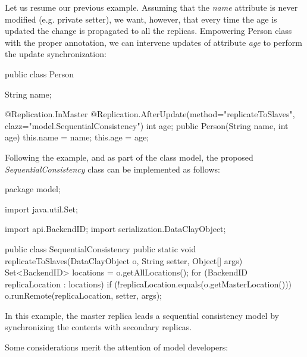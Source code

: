 Let us resume our previous example. Assuming that the \textit{name} attribute is never modified (e.g. private setter), we want, however, that every time the age is updated the change is propagated to all the replicas. Empowering Person class with the proper annotation, we can intervene updates of attribute \textit{age} to perform the update synchronization:

\begin{tBox}
\begin{java}
public class Person {
  String name;

  @Replication.InMaster
  @Replication.AfterUpdate(method="replicateToSlaves",
                                    clazz="model.SequentialConsistency")
  int age;
  public Person(String name, int age) {
    this.name = name;
    this.age = age;
  }
}
\end{java}
\end{tBox}

Following the example, and as part of the class model, the proposed \textit{SequentialConsistency} class can be implemented as follows:

\begin{tBox}
\begin{java}
package model;

import java.util.Set;

import api.BackendID;
import serialization.DataClayObject;

public class SequentialConsistency {
  public static void replicateToSlaves(DataClayObject o, String setter, Object[] args) {
    Set<BackendID> locations = o.getAllLocations();
    for (BackendID replicaLocation : locations) {
      if (!replicaLocation.equals(o.getMasterLocation())) {
         o.runRemote(replicaLocation, setter, args);
      }
    }
  }
}
\end{java}
\end{tBox}

In this example, the master replica leads a sequential consistency model by synchronizing the contents with secondary replicas. 

Some considerations merit the attention of model developers:

